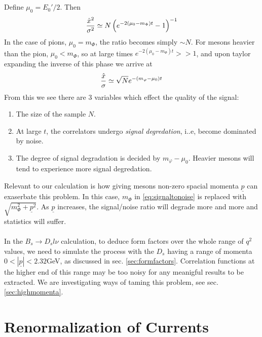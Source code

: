 \\ \\
Define $\mu_0 = E_0'/2$. Then
\begin{align}
	{\hat{x}^2\over \sigma^2} \simeq N \left( e^{-2(\mu_0 - m_{\Phi})t} - 1 \right) ^{-1}
\end{align}
In the case of pions, $\mu_0 = m_{\Phi}$, the ratio becomes simply $\sim N$. For mesons heavier than the pion, $\mu_0 < m_{\Phi}$, so at large times $e^{-2(\mu_0 - m_{\Phi})t} >> 1$, and upon taylor expanding the inverse of this phase we arrive at
\begin{align}
	{\hat{x}\over\sigma} \simeq \sqrt{N} e^{-(m_{\varphi} - \mu_0)t}
	\label{eq:signaltonoise}
\end{align}
From this we see there are 3 variables which effect the quality of the signal:
\begin{enumerate}
\item
The size of the sample $N$.
\item
At large $t$, the correlators undergo {\it{signal degredation}}, i..e, become dominated by noise.
\item
The degree of signal degradation is decided by $m_{\varphi} - \mu_0$. Heavier mesons will tend to experience more signal degredation.
\end{enumerate}
Relevant to our calculation is how giving mesons non-zero spacial momenta $\underline{p}$ can exaserbate this problem. In this case, $m_{\Phi}$ in \eqref{eq:signaltonoise} is replaced with $\sqrt{m_{\Phi}^2+\underline{p}^2}$. As $\underline{p}$ increases, the signal/noise ratio will degrade more and more and statistics will suffer. 
\\ \\
In the $B_s\to D_s l\nu$ calculation, to deduce form factors over the whole range of $q^2$ values, we need to simulate the process with the $D_s$ having a range of momenta $0 < |\underline{p}| < 2.32$GeV, as discussed in sec. \ref{sec:formfactors}. Correlation functions at the higher end of this range may be too noisy for any meanigful results to be extracted. We are investigating ways of taming this problem, see sec. \ref{sec:highmomenta}.

\section{Renormalization of Currents}

{}



